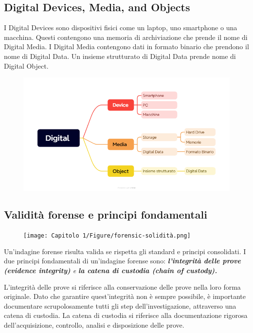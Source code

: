 \subsection{Digital Devices, Media, and Objects}
I Digital Devices sono dispositivi fisici come un laptop, uno smartphone o una macchina. Questi contengono una memoria di archiviazione che prende il nome di Digital Media. I Digital Media contengono dati in formato binario che prendono il nome di Digital Data. Un insieme strutturato di Digital Data prende nome di Digital Object.
\begin{figure}[h!]
    \includegraphics[width=\textwidth]{Capitolo 1/Figure/schema-digital-devices-media-object.png}
\end{figure}

\clearpage
\subsection{Validità forense e principi fondamentali}
\begin{figure}[h!]
    \texttt{[image: Capitolo 1/Figure/forensic-solidità.png]}
\end{figure}

Un'indagine forense risulta valida se rispetta gli standard e principi consolidati.
I due principi fondamentali di un'indagine forense sono: \textit{\textbf{l'integrità delle prove (evidence integrity)} e \textbf{la catena di custodia (chain of custody).}}

L'integrità delle prove si riferisce alla conservazione delle prove nella loro forma originale.
Dato che garantire quest'integrità non è sempre possibile, è importante documentare scrupolosamente tutti gli step dell'investigazione, attraverso una catena di custodia.
La catena di custodia si riferisce alla documentazione rigorosa dell'acquisizione, controllo, analisi e disposizione delle prove.

